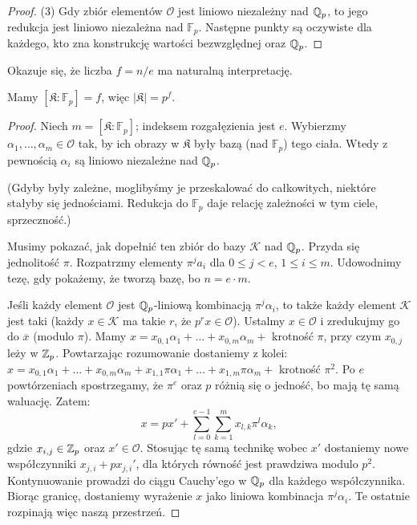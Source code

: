 \begin{proof}(3)
	Gdy zbiór elementów $\mathcal O$ jest liniowo niezależny nad $\mathbb Q_p$, to jego redukcja jest liniowo niezależna nad $\mathbb F_p$.
Następne punkty są oczywiste dla każdego, kto zna konstrukcję wartości bezwzględnej oraz $\mathbb Q_p$.
\end{proof}

Okazuje się, że liczba $f = n/e$ ma naturalną interpretację.

\begin{fakt}
	Mamy $[\mathfrak K : \mathbb F_p] = f$, więc $|\mathfrak K| = p^f$.
\end{fakt}

\begin{proof}
	Niech $m = [\mathfrak K : \mathbb F_p]$; indeksem rozgałęzienia jest $e$.
	Wybierzmy $\alpha_1, \dots, \alpha_m \in \mathcal O$ tak, by ich obrazy w $\mathfrak K$ były bazą (nad $\mathbb F_p$) tego ciała.
	Wtedy z pewnością $\alpha_i$ są liniowo niezależne nad $\mathbb Q_p$.

	(Gdyby były zależne, moglibyśmy je przeskalować do całkowitych, niektóre stałyby się jednościami.
	Redukcja do $\mathbb F_p$ daje relację zależności w tym ciele, sprzeczność.)

	Musimy pokazać, jak dopełnić ten zbiór do bazy $\mathcal K$ nad $\mathbb Q_p$.
	Przyda się jednolitość $\pi$. Rozpatrzmy elementy $\pi^j a_i$ dla $0 \le j < e$, $1 \le i \le m$.
	Udowodnimy tezę, gdy pokażemy, że tworzą bazę, bo $n = e \cdot m$.

	Jeśli każdy element $\mathcal O$ jest $\mathbb Q_p$-liniową kombinacją $\pi^j \alpha_i$, to także każdy element $\mathcal K$ jest taki (każdy $x \in \mathcal K$ ma takie $r$, że $p^r x \in \mathcal O$).
	Ustalmy $x \in \mathcal O$ i zredukujmy go do $\overline x$ (modulo $\pi$).
	Mamy $x = x_{0,1} \alpha_1 + \dots + x_{0,m}\alpha_m +$ krotność $\pi$, przy czym $x_{0,j}$ leży w $\mathbb Z_p$.
	Powtarzając rozumowanie dostaniemy z kolei:
	$x = x_{0,1} \alpha_1 + \dots + x_{0,m}\alpha_m + x_{1,1} \pi \alpha_1 + \dots + x_{1,m} \pi \alpha_m + $ krotność $\pi^2$.
	Po $e$ powtórzeniach spostrzegamy, że $\pi^e$ oraz $p$ różnią się o jedność, bo mają tę samą waluację.
	Zatem:
	\[
		x = px' + \sum_{l=0}^{e-1} \sum_{k=1}^m x_{l,k} \pi^l \alpha_k,
	\]
	gdzie $x_{i,j} \in \mathbb Z_p$ oraz $x' \in \mathcal O$.
	Stosując tę samą technikę wobec $x'$ dostaniemy nowe współczynniki $x_{j,i} + px_{j,i}'$, dla których równość jest prawdziwa modulo $p^2$.
	Kontynuowanie prowadzi do ciągu Cauchy'ego w $\mathbb Q_p$ dla każdego współczynnika.
	Biorąc granicę, dostaniemy wyrażenie $x$ jako liniowa kombinacja $\pi^j \alpha_i$.
	Te ostatnie rozpinają więc naszą przestrzeń.


\end{proof}
